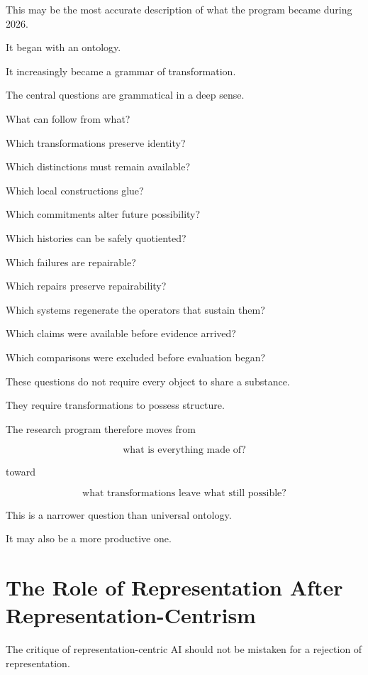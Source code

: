 \documentclass[11pt]{article}
\theoremstyle{remark}
\begin{document}
This may be the most accurate description of what the program became during 2026.

It began with an ontology.

It increasingly became a grammar of transformation.

The central questions are grammatical in a deep sense.

What can follow from what?

Which transformations preserve identity?

Which distinctions must remain available?

Which local constructions glue?

Which commitments alter future possibility?

Which histories can be safely quotiented?

Which failures are repairable?

Which repairs preserve repairability?

Which systems regenerate the operators that sustain them?

Which claims were available before evidence arrived?

Which comparisons were excluded before evaluation began?

These questions do not require every object to share a substance.

They require transformations to possess structure.

The research program therefore moves from

\begin{equation}
\text{what is everything made of?}
\end{equation}

toward

\begin{equation}
\boxed{
\text{what transformations leave what still possible?}
}
\end{equation}

This is a narrower question than universal ontology.

It may also be a more productive one.

\section{The Role of Representation After Representation-Centrism}

The critique of representation-centric AI should not be mistaken for a rejection of representation.
\end{document}

